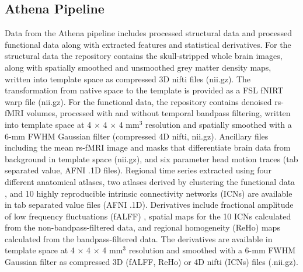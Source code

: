 \documentclass[preprint,12pt,3p]{elsarticle}
\begin{document}

\subsection{Athena Pipeline} Data from the Athena pipeline includes processed structural data and processed functional data along with extracted features and statistical derivatives. For the structural data the repository contains the skull-stripped whole brain images, along with spatially smoothed and unsmoothed grey matter density maps, written into template space as compressed 3D nifti files (nii.gz). The transformation from native space to the template is provided as a FSL fNIRT warp file (nii.gz). For the functional data, the repository contains denoised rs-fMRI volumes, processed with and without temporal bandpass filtering, written into template space at 4 $\times$ 4 $\times$ 4 mm$^3$ resolution and spatially smoothed with a 6-mm FWHM Gaussian filter (compressed 4D nifti, nii.gz). Ancillary files including the mean rs-fMRI image and masks that differentiate brain data from background in template space (nii.gz), and six parameter head motion traces (tab separated value, AFNI .1D files). Regional time series extracted using four different anatomical atlases\cite{tzourio2002automated, lancaster2000automated, eickhoff2005new, HO_atlas_1, HO_atlas_2, HO_atlas_3, HO_atlas_4}, two atlases derived by clustering the functional data \cite{craddock2012whole}, and 10 highly reproducible intrinsic connectivity networks (ICNs) \cite{smith2009correspondence}  are available in tab separated value files (AFNI .1D). Derivatives include fractional amplitude of low frequency fluctuations (fALFF) \cite{zuo2008falff},  spatial maps for the 10 ICNs calculated from the non-bandpass-filtered data, and regional homogeneity (ReHo) \cite{zang2004regional} maps calculated from the bandpass-filtered data. The derivatives are available in template space at 4 $\times$ 4 $\times$ 4 mm$^3$ resolution and smoothed with a 6-mm FWHM Gaussian filter as compressed 3D (fALFF, ReHo) or 4D nifti (ICNs) files (.nii.gz).    
\end{document}
